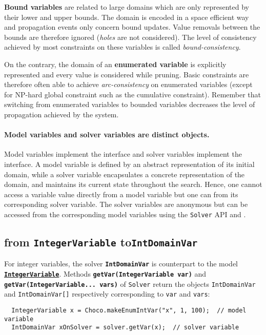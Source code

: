 \begin{note}
\textbf{Bound variables} are related to large domains which are only represented by their lower and upper bounds. The domain is encoded in a space efficient way and propagation events only concern bound updates. Value removals between the bounds are therefore ignored (\emph{holes} are not considered). The level of consistency achieved by most constraints on these variables is called \emph{bound-consistency}.

On the contrary, the domain of an \textbf{enumerated variable} is explicitly represented and every value is considered while pruning. Basic constraints are therefore often able to achieve \emph{arc-consistency} on enumerated variables (except for NP-hard global constraint such as the cumulative constraint). Remember that switching from enumerated variables to bounded variables decreases the level of propagation achieved by the system.
\end{note}


\paragraph{Model variables and solver variables are distinct objects.} 
Model variables implement the  interface and solver variables implement the  interface.
A model variable is defined by an abstract representation of its initial domain, while a solver variable encapsulates a concrete representation of the domain, and maintains its current state throughout the search.
Hence, one cannot access a variable value directly from a model variable but one can from its corresponding solver variable. The solver variables are anonymous but can be accessed from the corresponding model variables using the \texttt{Solver} API  and .

\subsection{from \texttt{IntegerVariable} to\texttt{IntDomainVar}}\label{solver:solverandintegervariables}\hypertarget{solver:solverandintegervariables}{}

For integer variables, the solver \textbf{\tt IntDomainVar} is counterpart to the model \hyperlink{integervariable}{\textbf{\tt IntegerVariable}}. 
Methods \textbf{\tt getVar(IntegerVariable var)} and \textbf{\tt getVar(IntegerVariable... vars)} of \texttt{Solver} return the objects \texttt{IntDomainVar} and \texttt{IntDomainVar[]} respectively corresponding to \texttt{var} and \texttt{vars}:
\begin{lstlisting}
  IntegerVariable x = Choco.makeEnumIntVar("x", 1, 100);  // model variable
  IntDomainVar xOnSolver = solver.getVar(x);  // solver variable
\end{lstlisting}


